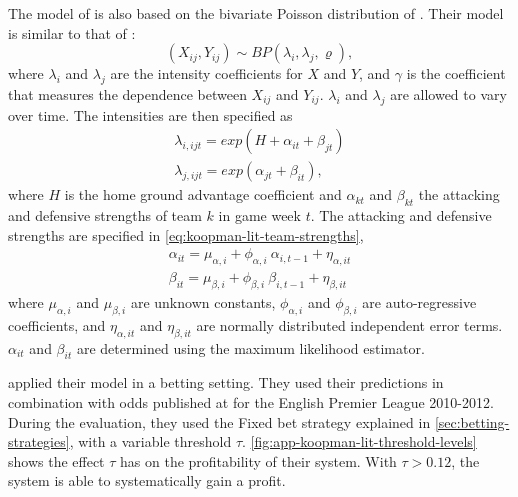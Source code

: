 The model of \citet{bib:koopman-lit-2015} is also based on the bivariate Poisson distribution of \citet{bib:maher-1982}. Their model is similar to that of \citet{bib:karlis-ntzoufras-2003}:
\begin{equation*}
    (X_{ij}, Y_{ij}) \sim BP(\lambda_{i}, \lambda_{j}, \varrho),
\end{equation*}
where $\lambda_{i}$ and $\lambda_{j}$ are the intensity coefficients for $X$ and $Y$, and $\gamma$ is the coefficient that measures the dependence between $X_{ij}$ and $Y_{ij}$. $\lambda_{i}$ and $\lambda_{j}$ are allowed to vary over time. The intensities are then specified as
\begin{equation*}
    \begin{aligned}
        \lambda_{i, ijt} = exp(H + \alpha_{it} + \beta_{jt}) \\
        \lambda_{j, ijt} = exp(\alpha_{jt} + \beta_{it}),
    \end{aligned}
\end{equation*}
where $H$ is the home ground advantage coefficient and $\alpha_{kt}$ and $\beta_{kt}$ the attacking and defensive strengths of team $k$ in game week $t$. The attacking and defensive strengths are specified in \cref{eq:koopman-lit-team-strengths},
\begin{equation}
    \begin{aligned}
        \alpha_{it} = \mu_{\alpha, i}  + \phi_{\alpha, i}\ \alpha_{i, t-1} + \eta_{\alpha, it} \\
        \beta_{it} = \mu_{\beta, i}  + \phi_{\beta, i} \ \beta_{i, t-1} + \eta_{\beta, it}
    \end{aligned}
    \label{eq:koopman-lit-team-strengths}
\end{equation}
where $\mu_{\alpha, i}$ and $\mu_{\beta, i}$ are unknown constants, $\phi_{\alpha, i}$ and $\phi_{\beta, i}$ are auto-regressive coefficients, and $\eta_{\alpha, it}$ and $\eta_{\beta, it}$ are normally distributed independent error terms. $\alpha_{it}$ and $\beta_{it}$ are determined using the maximum likelihood estimator.

\citet{bib:koopman-lit-2015} applied their model in a betting setting. They used their predictions in combination with odds published at \citet{bib:football-data} for the English Premier League 2010-2012. During the evaluation, they used the Fixed bet strategy explained in \cref{sec:betting-strategies}, with a variable threshold $\tau$. \cref{fig:app-koopman-lit-threshold-levels} shows the effect $\tau$ has on the profitability of their system. With $\tau > 0.12$, the system is able to systematically gain a profit.


